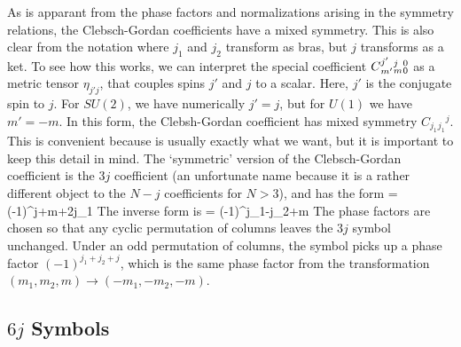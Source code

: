 \documentclass[12pt]{article}
\begin{document}
As is apparant from the phase factors and normalizations arising in
the symmetry relations, the Clebsch-Gordan coefficients have a mixed
symmetry. This is also clear from the notation 
where $j_1$ and $j_2$ transform as bras, but $j$ transforms as a ket.
To see how this works, we can interpret the special
coefficient $\qcg{j'}{j}{0}{m'}{m}{0}$ as a metric tensor $\eta_{j'j}$, that
couples spins $j'$ and $j$ to a scalar. Here, $j'$ is the conjugate
spin to $j$. For $SU(2)$, we have numerically $j' = j$, but for
$U(1)$ we have $m' = -m$. In this form, the Clebsh-Gordan coefficient
has mixed symmetry $C_{j_1} {}_{j_1} {}^{j}$. This is convenient 
because  is usually exactly what we want,
but it is important to keep this detail in mind. The `symmetric'
version of the Clebsch-Gordan coefficient is the $3j$ coefficient
(an unfortunate name because it is a rather different object to the
$N-j$ coefficients for $N > 3$), and has the form
\beq
{} = (-1)^{j+m+2j_1} 
\eeq
The inverse form is
\beq
{} = (-1)^{j_1-j_2+m} 
\eeq
The phase factors are chosen so that any cyclic permutation of columns leaves
the $3j$ symbol unchanged. Under an odd permutation of columns, the symbol
picks up a phase factor $(-1)^{j_1+j_2+j}$, which is the same phase factor
from the transformation $(m_1,m_2,m) \rightarrow (-m_1,-m_2,-m)$.

\subsection{$6j$ Symbols}
\end{document}
